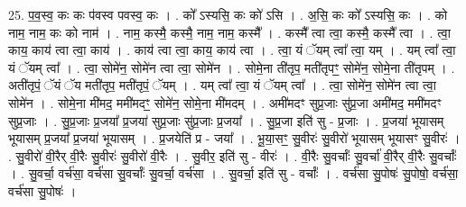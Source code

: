 \documentclass[17pt]{extarticle}
\begin{document}
25. प॒व॒स्व॒ कः कः प॑वस्व पवस्व॒ कः । . को᳚ ऽस्यसि॒ कः को॑ ऽसि । . अ॒सि॒ कः को᳚ ऽस्यसि॒ कः । . को नाम॒ नाम॒ कः को नाम॑ । . नाम॒ कस्मै॒ कस्मै॒ नाम॒ नाम॒ कस्मै᳚ । . कस्मै᳚ त्वा त्वा॒ कस्मै॒ कस्मै᳚ त्वा । . त्वा॒ काय॒ काय॑ त्वा त्वा॒ काय॑ । . काय॑ त्वा त्वा॒ काय॒ काय॑ त्वा । . त्वा॒ यं ॅयम् त्वा᳚ त्वा॒ यम् । . यम् त्वा᳚ त्वा॒ यं ॅयम् त्वा᳚ । . त्वा॒ सोमे॑न॒ सोमे॑न त्वा त्वा॒ सोमे॑न । . सोमे॒ना ती॑तृप॒ मती॑तृपꣳ॒॒ सोमे॑न॒ सोमे॒ना ती॑तृपम् । . अती॑तृपं॒ ॅयं ॅय मती॑तृप॒ मती॑तृपं॒ ॅयम् । . यम् त्वा᳚ त्वा॒ यं ॅयम् त्वा᳚ । . त्वा॒ सोमे॑न॒ सोमे॑न त्वा त्वा॒ सोमे॑न । . सोमे॒ना मी॑मद॒ ममी॑मदꣳ॒॒ सोमे॑न॒ सोमे॒ना मी॑मदम् । . अमी॑मदꣳ सुप्र॒जाः सु॑प्र॒जा अमी॑मद॒ ममी॑मदꣳ सुप्र॒जाः । . सु॒प्र॒जाः प्र॒जया᳚ प्र॒जया॑ सुप्र॒जाः सु॑प्र॒जाः प्र॒जया᳚ । . सु॒प्र॒जा इति॑ सु - प्र॒जाः । . प्र॒जया॑ भूयासम् भूयासम् प्र॒जया᳚ प्र॒जया॑ भूयासम् । . प्र॒जयेति॑ प्र - जया᳚ । . भू॒या॒सꣳ॒॒ सु॒वीरः॑ सु॒वीरो॑ भूयासम् भूयासꣳ सु॒वीरः॑ । . सु॒वीरो॑ वी॒रैर् वी॒रैः सु॒वीरः॑ सु॒वीरो॑ वी॒रैः । . सु॒वीर॒ इति॑ सु - वीरः॑ । . वी॒रैः सु॒वर्चाः᳚ सु॒वर्चा॑ वी॒रैर् वी॒रैः सु॒वर्चाः᳚ । . सु॒वर्चा॒ वर्च॑सा॒ वर्च॑सा सु॒वर्चाः᳚ सु॒वर्चा॒ वर्च॑सा । . सु॒वर्चा॒ इति॑ सु - वर्चाः᳚ । . वर्च॑सा सु॒पोषः॑ सु॒पोषो॒ वर्च॑सा॒ वर्च॑सा सु॒पोषः॑ । \newline
\end{document}
